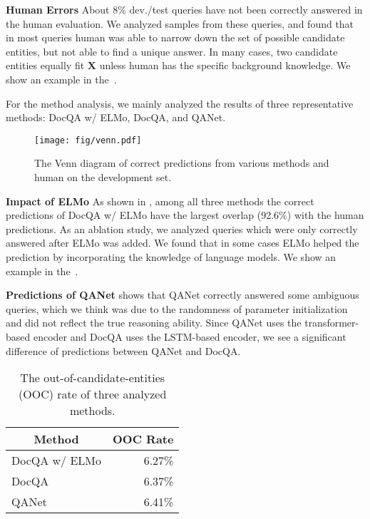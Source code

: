 \noindent\textbf{Human Errors}
About 8\% dev./test queries have not been correctly answered in the human evaluation.
We analyzed samples from these queries, and found that in most queries human was able to narrow down the set of possible candidate entities, but not able to find a unique answer. 
In many cases, two candidate entities equally fit $\mathbf{X}$ unless human has the specific background knowledge. 
We show an example in the~.

For the method analysis, we mainly analyzed the results of three representative methods: DocQA w/ ELMo, DocQA, and QANet.

\begin{figure}[!ht]
\centering
\texttt{[image: fig/venn.pdf]}
\caption{The Venn diagram of correct predictions from various methods and human on the development set.\label{fig:venn}}
\end{figure}

\noindent\textbf{Impact of ELMo}
As shown in , among all three methods the correct predictions of DocQA w/ ELMo have the largest overlap
(92.6\%) with the human predictions.
As an ablation study, we analyzed queries which were only correctly answered after ELMo was added.
We found that in some cases ELMo helped the prediction by incorporating the knowledge of language models.
We show an example in the~.

\noindent\textbf{Predictions of QANet}
 shows that QANet correctly answered some ambiguous queries, which we think was due to the randomness of parameter initialization and did not reflect the true reasoning ability. 
Since QANet uses the transformer-based encoder and DocQA uses the LSTM-based encoder, 
we see a significant difference of predictions between QANet and DocQA.

\begin{table}[!ht]
\centering
\begin{tabular}{@{}lr@{}}
\toprule
\multicolumn{1}{c}{Method} & \multicolumn{1}{c}{OOC Rate} \\ \midrule
DocQA w/ ELMo              & 6.27\%                                \\
DocQA                      & 6.37\%                                \\
QANet                      & 6.41\%                                \\ \bottomrule
\end{tabular}
\caption{The out-of-candidate-entities (OOC) rate of three analyzed methods.}
\label{tab:ooc}
\end{table}

